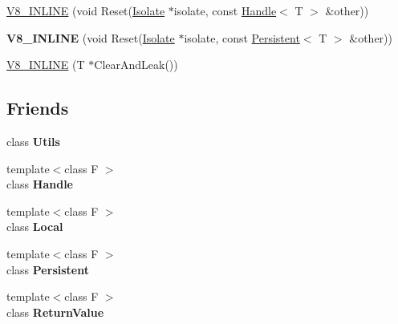 \begin{DoxyCompactItemize}
\item 
\hyperlink{classv8_1_1_persistent_a55b4861576f082c14bb86af2bc3b88bf}{V8\+\_\+\+I\+N\+L\+I\+N\+E} (void Reset(\hyperlink{classv8_1_1_isolate}{Isolate} $\ast$isolate, const \hyperlink{classv8_1_1_handle}{Handle}$<$ T $>$ \&other))
\item 
\hypertarget{classv8_1_1_persistent_a7ac21e12fee1ec69dac4acba008a181d}{}{\bfseries V8\+\_\+\+I\+N\+L\+I\+N\+E} (void Reset(\hyperlink{classv8_1_1_isolate}{Isolate} $\ast$isolate, const \hyperlink{classv8_1_1_persistent}{Persistent}$<$ T $>$ \&other))\label{classv8_1_1_persistent_a7ac21e12fee1ec69dac4acba008a181d}

\item 
\hyperlink{classv8_1_1_persistent_a14f3ade66f923281840a82d62037cccd}{V8\+\_\+\+I\+N\+L\+I\+N\+E} (T $\ast$Clear\+And\+Leak())
\end{DoxyCompactItemize}
\subsection*{Friends}
\begin{DoxyCompactItemize}
\item 
\hypertarget{classv8_1_1_persistent_abc0f7da619e9e72510dc07ed7b5ff6d8}{}class {\bfseries Utils}\label{classv8_1_1_persistent_abc0f7da619e9e72510dc07ed7b5ff6d8}

\item 
\hypertarget{classv8_1_1_persistent_a67ca1a2d91273eaf85fb3d23ba8ce984}{}{\footnotesize template$<$class F $>$ }\\class {\bfseries Handle}\label{classv8_1_1_persistent_a67ca1a2d91273eaf85fb3d23ba8ce984}

\item 
\hypertarget{classv8_1_1_persistent_afb872edb4aac7ba55f0da004113aa2b0}{}{\footnotesize template$<$class F $>$ }\\class {\bfseries Local}\label{classv8_1_1_persistent_afb872edb4aac7ba55f0da004113aa2b0}

\item 
\hypertarget{classv8_1_1_persistent_afaadbbd2553180545a4e018c3eeac71e}{}{\footnotesize template$<$class F $>$ }\\class {\bfseries Persistent}\label{classv8_1_1_persistent_afaadbbd2553180545a4e018c3eeac71e}

\item 
\hypertarget{classv8_1_1_persistent_a53f604d3d6f2dc0647df33c9979f116a}{}{\footnotesize template$<$class F $>$ }\\class {\bfseries Return\+Value}\label{classv8_1_1_persistent_a53f604d3d6f2dc0647df33c9979f116a}

\end{DoxyCompactItemize}


